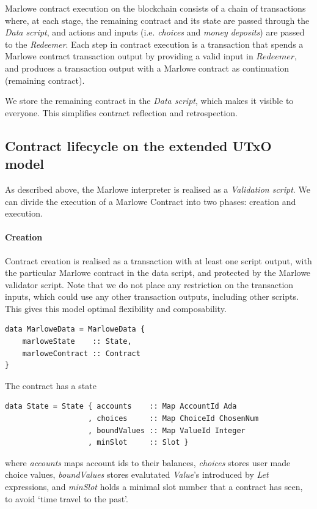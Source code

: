 \documentclass[runningheads]{llncs}
\begin{document}
\noindent
Marlowe contract execution on the blockchain consists of a chain of transactions
where, at each stage, the remaining contract and its state are passed through the \emph{Data script},
and actions and inputs (i.e. \emph{choices} and \emph{money deposits}) are passed to the %
\emph{Redeemer}.
Each step in contract execution is a transaction that spends a Marlowe contract transaction output
by providing a valid input in $Redeemer$, and produces a transaction output
with a Marlowe contract as continuation (remaining contract).

We store the remaining contract in the \emph{Data script}, which makes it visible to everyone.
This simplifies contract reflection and retrospection.

\subsection{Contract lifecycle on the extended UTxO model}

As described above, the Marlowe interpreter is realised as a \emph{Validation script}.
We can divide the execution of a Marlowe Contract into two phases:
creation and execution.

\paragraph{Creation}

Contract creation is realised as a transaction
with at least one script output,
with the particular Marlowe contract in the data script, and protected by the Marlowe validator script.
Note that we do not place any restriction on the transaction inputs, which could use any other transaction
outputs, including other scripts. This gives this model optimal flexibility and composability.

\begin{verbatim}
data MarloweData = MarloweData {
    marloweState    :: State,
    marloweContract :: Contract
}
\end{verbatim}
\noindent
The contract has a state

\begin{verbatim}
data State = State { accounts    :: Map AccountId Ada
                   , choices     :: Map ChoiceId ChosenNum
                   , boundValues :: Map ValueId Integer
                   , minSlot     :: Slot }
\end{verbatim}

\noindent%
where \emph{accounts} maps account ids to their balances, \emph{choices} stores user made choice values,
\emph{boundValues} stores evalutated \emph{Value}'s introduced by \emph{Let} expressions,
and \emph{minSlot} holds a minimal slot number that a contract has seen, to avoid `time travel to the past'.
\end{document}
